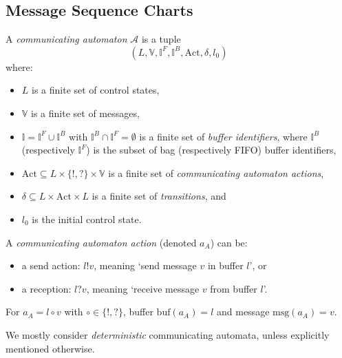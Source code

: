
\subsection{Message Sequence Charts}

\begin{definition}
    A \textit{communicating automaton} \(\mathcal{A}\) is a tuple 
    \[
    (L, \mathbb{V}, \mathbb{I}^F, \mathbb{I}^B, \text{Act}, \delta, l_0)
    \]
    where:
    \begin{itemize}
        \item \( L \) is a finite set of control states,
        \item \( \mathbb{V} \) is a finite set of messages,
        \item \( \mathbb{I} = \mathbb{I}^F \cup \mathbb{I}^B \) with \( \mathbb{I}^B \cap \mathbb{I}^F = \emptyset \)
        is a finite set of \textit{buffer identifiers}, where \( \mathbb{I}^B \) (respectively \( \mathbb{I}^F \)) 
        is the subset of bag (respectively FIFO) buffer identifiers,
        \item \( \text{Act} \subseteq L \times \{!, ?\} \times \mathbb{V} \) is a finite set of
        \textit{communicating automaton actions},
        \item \( \delta \subseteq L \times \text{Act} \times L \) is a finite set of \textit{transitions}, and
        \item \( l_0 \) is the initial control state.
    \end{itemize}
\end{definition}

A \textit{communicating automaton action} (denoted \( a_A \)) can be:
\begin{itemize}
    \item a send action: \( l!v \), meaning ‘send message \( v \) in buffer \( l \)’, or
    \item a reception: \( l?v \), meaning ‘receive message \( v \) from buffer \( l \)’.
\end{itemize}

For \( a_A = l \circ v \) with \( \circ \in \{!, ?\} \), buffer \( \text{buf}(a_A) = l \) and message \( \text{msg}(a_A) = v \).

We mostly consider \textit{deterministic} communicating automata, unless explicitly mentioned otherwise.

